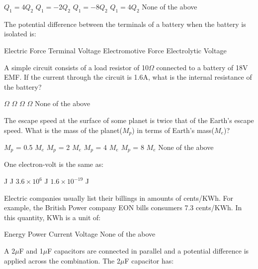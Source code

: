 \documentclass[13pt,addpoints]{exam}
\begin{document}
{{{\begin{questions}
					\begin{oneparchoices}
						\choice $Q_1=4Q_2$
						\choice $Q_1=-2Q_2$
						\choice $Q_1=-8Q_2$
						\choice $Q_1=4Q_2$
						\choice None of the above
					\end{oneparchoices}
					\question The potential difference between the terminals of a battery when the battery is isolated is:\\
					\begin{oneparchoices}
						\choice Electric Force
						\choice Terminal Voltage
						\choice Electromotive Force
						\choice Electrolytic Voltage
					\end{oneparchoices}
					\question A simple circuit consists of a load resistor of 10$\Omega$ connected to a battery of 18V EMF. If the current through the circuit is 1.6A, what is the internal resistance of the battery?\\
					\begin{oneparchoices}
						\choice 1.25$\Omega$
						\choice 12.5$\Omega$
						\choice 10$\Omega$
						\choice 1.6$\Omega$
						\choice None of the above
					\end{oneparchoices}
					\question The escape speed at the surface of some planet is twice that of the Earth's escape speed. What is the mass of the planet($M_p$) in terms of Earth's mass($M_e$)?\\
					\begin{oneparchoices}
						\choice $M_p$ = 0.5 $M_e$
						\choice $M_p$ = 2 $M_e$
						\choice $M_p$ = 4 $M_e$
						\choice $M_p$ = 8 $M_e$
						\choice None of the above
					\end{oneparchoices}
					\question One electron-volt is the same as:\\
					\begin{oneparchoices}
						\choice 3.6 J
						\choice 1.0 J
						\choice $3.6\times10^{6}$ J
						\choice $1.6\times10^{-19}$ J
					\end{oneparchoices}
					\question Electric companies usually list their billings in amounts of cents/KWh. For example, the British Power company EON bills consumers 7.3 cents/KWh. In this quantity, KWh is a unit of:\\
					\begin{oneparchoices}
						\choice Energy
						\choice Power
						\choice Current
						\choice Voltage
						\choice None of the above
					\end{oneparchoices}
					\question A 2$\mu$F and 1$\mu$F capacitors are connected in parallel and a potential difference is applied across the combination. The 2$\mu$F capacitor has:

\end{questions}}}}
\end{document}
